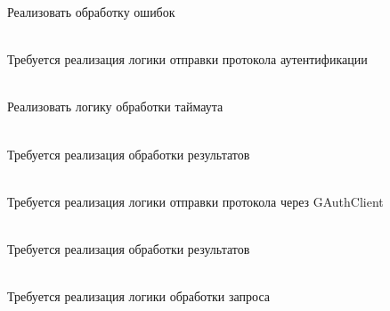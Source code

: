 \begin{DoxyRefList}
Реализовать обработку ошибок  
\item[Member \doxylink{class_g_n_e_t_1_1_matrix_passwd2_a33af4c45fa48d7bf6dc251ab5178f3e5}{GNET\+::Matrix\+Passwd2\+::Delivery} (Manager\+::\+Session\+::\+ID proxy\+\_\+sid, const Octets\+Stream \&os\+Arg)]\hfill \\
\label{todo__todo000030}%
%
Требуется реализация логики отправки протокола аутентификации  
\item[Member \doxylink{class_g_n_e_t_1_1_matrix_passwd2_abd67d4f58dcf3a3a917209810ead7a7c}{GNET\+::Matrix\+Passwd2\+::On\+Timeout} ()]\hfill \\
\label{todo__todo000032}%
%
Реализовать логику обработки таймаута  
\item[Member \doxylink{class_g_n_e_t_1_1_matrix_passwd2_a433faf7b2ff9ec3e3e7cf91a8fc7fb8d}{GNET\+::Matrix\+Passwd2\+::Post\+Process} (Manager\+::\+Session\+::\+ID proxy\+\_\+sid, const Octets\+Stream \&os\+Arg, const Octets\+Stream \&os\+Res)]\hfill \\
\label{todo__todo000031}%
%
Требуется реализация обработки результатов  
\item[Member \doxylink{class_g_n_e_t_1_1_matrix_token_afa6e24621cac8593c4e95ed22cc12338}{GNET\+::Matrix\+Token\+::Delivery} (Manager\+::\+Session\+::\+ID proxy\+\_\+sid, const Octets\+Stream \&os\+Arg)]\hfill \\
\label{todo__todo000033}%
%
Требуется реализация логики отправки протокола через GAuth\+Client  
\item[Member \doxylink{class_g_n_e_t_1_1_matrix_token_a784d6fa1f7f2a7fd6df54da5fb83c885}{GNET\+::Matrix\+Token\+::Post\+Process} (Manager\+::\+Session\+::\+ID proxy\+\_\+sid, const Octets\+Stream \&os\+Arg, const Octets\+Stream \&os\+Res)]\hfill \\
\label{todo__todo000034}%
%
Требуется реализация обработки результатов  
\item[Member \doxylink{class_g_n_e_t_1_1_s_s_o_get_ticket_req_a7d2f631129750466c71a3c53910adad9}{GNET\+::SSOGet\+Ticket\+Req\+::Process} (Manager \texorpdfstring{$\ast$}{*}manager, Manager\+::\+Session\+::\+ID sid)]\hfill \\
\label{todo__todo000036}%
%
Требуется реализация логики обработки запроса 
\item[Member \doxylink{class_g_n_e_t_1_1_status_announce_ae5a6d07d7f9047b0d0a53cce09ed94b9}{GNET\+::Status\+Announce\+::Process} (Manager \texorpdfstring{$\ast$}{*}manager, Manager\+::\+Session\+::\+ID sid)]\hfill \\

\end{DoxyRefList}
